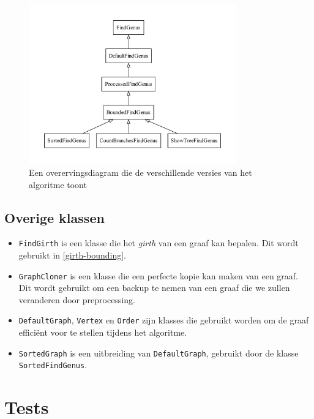 \documentclass{article}
\begin{document}
\begin{figure}
\begin{center}
\includegraphics[width=0.8\textwidth]{images/inheritance.pdf}
\caption{Een overervingsdiagram die de verschillende versies van het algoritme
toont}
\label{fig:inheritance}
\end{center}
\end{figure}

\subsection{Overige klassen}
\begin{itemize}
\item \verb#FindGirth# is een klasse die het \emph{girth} van een graaf kan
bepalen. Dit wordt gebruikt in \ref{girth-bounding}.
\item \verb#GraphCloner# is een klasse die een perfecte kopie kan maken van
een graaf. Dit wordt gebruikt om een backup te nemen van een graaf die we
zullen veranderen door preprocessing.
\item \verb#DefaultGraph#, \verb#Vertex# en \verb#Order# zijn klasses die
gebruikt worden om de graaf effici\"ent voor te stellen tijdens het algoritme.
\item \verb#SortedGraph# is een uitbreiding van \verb#DefaultGraph#, gebruikt
door de klasse \verb#SortedFindGenus#.
\end{itemize}

\section{Tests}
\end{document}
